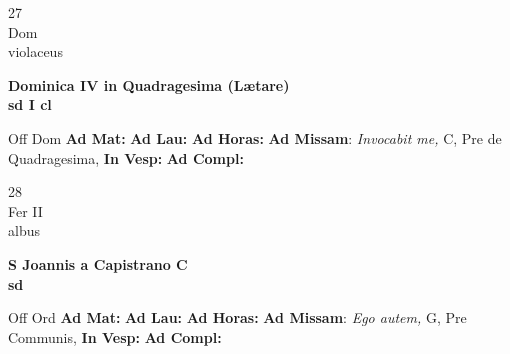 \documentclass[10pt, openany]{book}
\begin{document}
        \begin{center}
            \begin{minipage}{3.5in}
                \vspace{2em}
                \begin{minipage}{0.5in}
                    {\Huge 27} \\
                    {\normalsize Dom} \\
                    {\normalsize violaceus}
                \end{minipage}
                \begin{minipage}{3.0in}
                    \textbf{ \large Dominica IV in Quadragesima (Lætare) \\
                    \textnormal{\normalsize sd I cl}} \\ 
                \end{minipage}
                \begin{justify}Off Dom
                    \textbf{Ad Mat: }
                    \textbf{Ad Lau: }
                    \textbf{Ad Horas: }\textbf{Ad Missam}: \textit{Invocabit me,} C, Pre de Quadragesima,  
                    \textbf{In Vesp: }
                    \textbf{Ad Compl: }
                \end{justify}
            \end{minipage}
        \end{center}
    
        \begin{center}
            \begin{minipage}{3.5in}
                \vspace{2em}
                \begin{minipage}{0.5in}
                    {\Huge 28} \\
                    {\normalsize Fer II} \\
                    {\normalsize albus}
                \end{minipage}
                \begin{minipage}{3.0in}
                    \textbf{ \large S Joannis a Capistrano C \\
                    \textnormal{\normalsize sd}} \\ 
                \end{minipage}
                \begin{justify}Off Ord
                    \textbf{Ad Mat: }
                    \textbf{Ad Lau: }
                    \textbf{Ad Horas: }\textbf{Ad Missam}: \textit{Ego autem,} G, Pre Communis,  
                    \textbf{In Vesp: }
                    \textbf{Ad Compl: }
                \end{justify}
            \end{minipage}
        \end{center}
    
\end{document}

